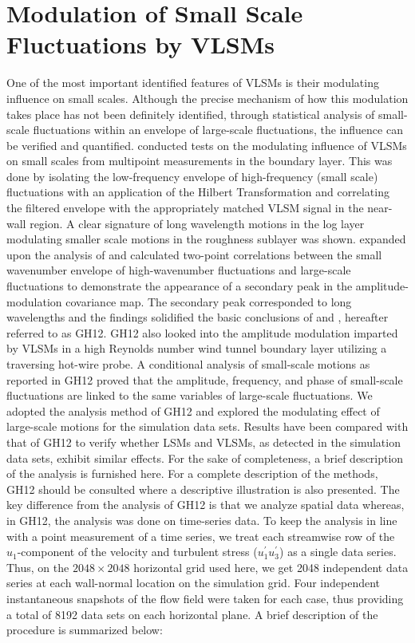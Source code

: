 \section{Modulation of Small Scale Fluctuations by VLSMs}
\label{Modulation_VLSMs}

One of the most important identified features of VLSMs is their modulating influence on small scales. Although the precise mechanism of how this modulation takes place has not been definitely identified, through statistical analysis of small-scale fluctuations within an envelope of large-scale fluctuations, the influence can be verified and quantified. \citet{MATHIS2009} conducted tests on the modulating influence of VLSMs on small scales from multipoint measurements in the boundary layer. This was done by isolating the low-frequency envelope of high-frequency (small scale) fluctuations with an application of the Hilbert Transformation and correlating the filtered envelope with the appropriately matched VLSM signal in the near-wall region. A clear signature of long wavelength motions in the log layer modulating smaller scale motions in the roughness sublayer was shown. \citet{Bernardini2011} expanded upon the analysis of \citet{MATHIS2009} and calculated two-point correlations between the small wavenumber envelope of high-wavenumber fluctuations and large-scale fluctuations to demonstrate the appearance of a secondary peak in the amplitude-modulation covariance map. The secondary peak corresponded to long wavelengths and the findings solidified the basic conclusions of \citet{MATHIS2009} and \citet{ganapathi_jfm_2012_modulation}, hereafter referred to as GH12.  GH12 also looked into the amplitude modulation imparted by VLSMs in a high Reynolds number wind tunnel boundary layer utilizing a traversing hot-wire probe. A conditional analysis of small-scale motions as reported in GH12 proved that the amplitude, frequency, and phase of small-scale fluctuations are linked to the same variables of large-scale fluctuations. We adopted the analysis method of GH12 and explored the modulating effect of large-scale motions for the simulation data sets.  Results have been compared with that of GH12 to verify whether LSMs and VLSMs, as detected in the simulation data sets, exhibit similar effects.  For the sake of completeness, a brief description of the analysis is furnished here. For a complete description of the methods, GH12 should be consulted where a descriptive illustration is also presented. The key difference from the analysis of GH12 is that we analyze spatial data whereas, in GH12, the analysis was done on time-series data. To keep the analysis in line with a point measurement of a time series, we treat each streamwise row of the $u_{1}$-component of the velocity and turbulent stress ($u_{1}^{\prime} u_{3}^{\prime}$) as a single data series. Thus, on the $2048 \times 2048$ horizontal grid used here, we get 2048 independent data series at each wall-normal location on the simulation grid.  Four independent instantaneous snapshots of the flow field were taken for each case, thus providing a total of 8192 data sets on each horizontal plane. A brief description of the procedure is summarized below:
